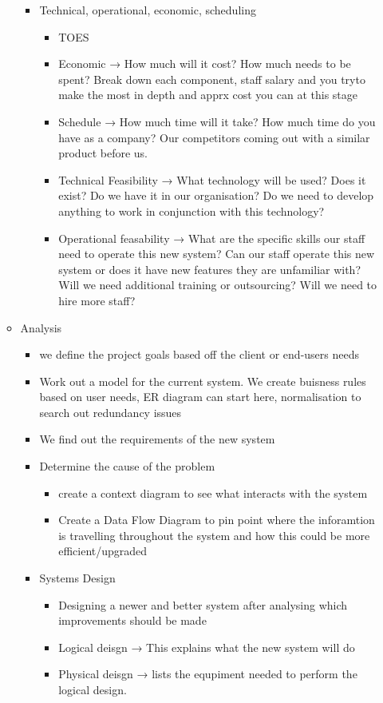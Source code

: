 \documentclass[12pt, a4, twoside]{article}
\begin{document}
\begin{itemize}
\begin{itemize}
\begin{itemize}
        \item Technical, operational, economic, scheduling
        \begin{itemize}
          \item TOES
          \item Economic → How much will it cost? How much needs to be spent? Break down each component, staff salary and you tryto make the most in depth and apprx cost you can at this stage
          \item Schedule → How much time will it take? How much time do you have as a company? Our competitors coming out with a similar product before us.
          \item Technical Feasibility → What technology will be used? Does it exist? Do we have it in our organisation? Do we need to develop anything to work in conjunction with this technology?
          \item Operational feasability → What are the specific skills our staff need to operate this new system? Can our staff operate this new system or does it have new features they are unfamiliar with? Will we need additional training or outsourcing? Will we need to hire more staff?
        \end{itemize}
      \end{itemize}
      \item Analysis
      \begin{itemize}
        \item we define the project goals based off the client or end-users needs
        \item Work out a model for the current system. We create buisness rules based on user needs, ER diagram can start here, normalisation to search out redundancy issues
        \item We find out the requirements of the new system
        \item Determine the cause of the problem
        \begin{itemize}
          \item create a context diagram to see what interacts with the system
          \item Create a Data Flow Diagram to pin point where the inforamtion is travelling throughout the system and how this could be more efficient/upgraded
        \end{itemize}
        \item Systems Design
        \begin{itemize}
          \item Designing a newer and better system after analysing which improvements should be made
          \item Logical deisgn → This explains what the new system will do
          \item Physical deisgn → lists the equpiment needed to perform the logical design.
        \end{itemize}
      \end{itemize}
      

\end{itemize}
\end{itemize}
\end{document}
